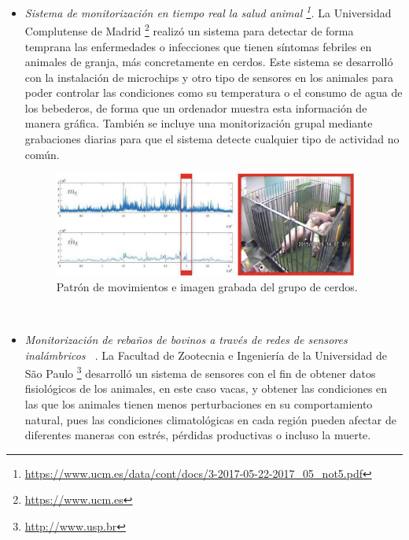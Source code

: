 \begin{itemize}
 \item \textit{Sistema de monitorización en tiempo real la salud animal \footnote{\url{https://www.ucm.es/data/cont/docs/3-2017-05-22-2017_05_not5.pdf}}.} La Universidad Complutense de Madrid \footnote{\url{https://www.ucm.es}} realizó un sistema para detectar de forma temprana las enfermedades o infecciones que tienen síntomas febriles en animales de granja, más concretamente en cerdos. Este sistema se desarrolló con la instalación de microchips y otro tipo de sensores en los animales para poder controlar las condiciones como su temperatura o el consumo de agua de los bebederos, de forma que un ordenador muestra esta información de manera gráfica. También se incluye una monitorización grupal mediante grabaciones diarias para que el sistema detecte cualquier tipo de actividad no común. 
\begin{figure} [h!]
  \begin{center}
    \includegraphics[width=10cm]{figs/ucm}
  \end{center}
  \caption{Patrón de movimientos e imagen grabada del grupo de cerdos.}
  \label{fig:uc}
\end{figure}\

\item \textit{Monitorización de rebaños de bovinos a través de redes de sensores inalámbricos ~\cite{arce09}}. La Facultad de Zootecnia e Ingeniería de la Universidad de São Paulo \footnote{\url{http://www.usp.br}} desarrolló un sistema de sensores con el fin de obtener datos fisiológicos de los animales, en este caso vacas, y obtener las condiciones en las que los animales tienen menos perturbaciones en su comportamiento natural, pues las condiciones climatológicas en cada región pueden afectar de diferentes maneras con estrés, pérdidas productivas o incluso la muerte.


\end{itemize}
